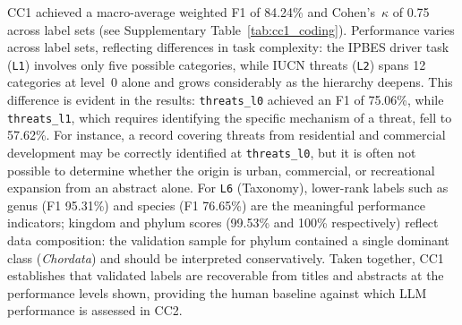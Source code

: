 \documentclass[12pt]{article}
\begin{document}
CC1 achieved a macro-average weighted F1 of 84.24\% and Cohen's~$\kappa$ of 0.75 across label sets (see Supplementary Table~\ref{tab:cc1_coding}). Performance varies across label sets, reflecting differences in task complexity: the IPBES driver task (\texttt{L1}) involves only five possible categories, while IUCN threats (\texttt{L2}) spans 12 categories at level~0 alone and grows considerably as the hierarchy deepens. This difference is evident in the results: \texttt{threats\_l0} achieved an F1 of 75.06\%, while \texttt{threats\_l1}, which requires identifying the specific mechanism of a threat, fell to 57.62\%. For instance, a record covering threats from residential and commercial development may be correctly identified at \texttt{threats\_l0}, but it is often not possible to determine whether the origin is urban, commercial, or recreational expansion from an abstract alone. For \texttt{L6} (Taxonomy), lower-rank labels such as genus (F1 95.31\%) and species (F1 76.65\%) are the meaningful performance indicators; kingdom and phylum scores (99.53\% and 100\% respectively) reflect data composition: the validation sample for phylum contained a single dominant class (\textit{Chordata}) and should be interpreted conservatively. Taken together, CC1 establishes that validated labels are recoverable from titles and abstracts at the performance levels shown, providing the human baseline against which LLM performance is assessed in CC2.
\end{document}
